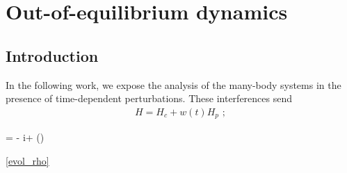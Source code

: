 \chapter{Out-of-equilibrium dynamics}

%
\section{Introduction}

In the following work, we expose the analysis of the many-body systems in the presence of time-dependent perturbations. These interferences send 
\begin{align}
	\label{Hmany-body}
	H = H_c + w(t) H_p \,\,;
\end{align}

	 = - i + (\rho) \pt
\ee

\cite{TV-21}
\ref{evol_rho}









